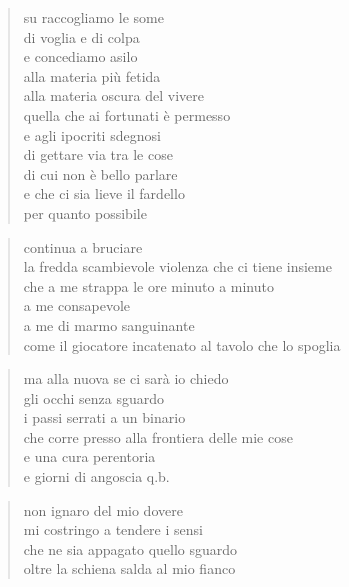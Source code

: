 	\begin{verse}
		su raccogliamo le some\\
		di voglia e di colpa\\
		e concediamo asilo\\
		alla materia più fetida\\
		alla materia oscura del vivere\\
		quella che ai fortunati è permesso\\
		e agli ipocriti sdegnosi\\
		di gettare via tra le cose\\
		di cui non è bello parlare\\
		e che ci sia lieve il fardello\\
		per quanto possibile
	\end{verse}

\clearpage


	\begin{verse}
		continua a bruciare\\
		la fredda scambievole violenza che ci tiene insieme\\
		che a me strappa le ore minuto a minuto\\
		a me consapevole\\
		a me di marmo sanguinante\\
		come il giocatore incatenato al tavolo che lo spoglia
	\end{verse}

	\begin{verse}
		ma alla nuova se ci sarà io chiedo\\
		gli occhi senza sguardo\\
		i passi serrati a un binario\\
		che corre presso alla frontiera delle mie cose\\
		e una cura perentoria\\
		e giorni di angoscia q.b.
	\end{verse}

\clearpage


	\begin{verse}
		non ignaro del mio dovere\\
		mi costringo a tendere i sensi\\
		che ne sia appagato quello sguardo\\
		oltre la schiena salda al mio fianco
	\end{verse}

